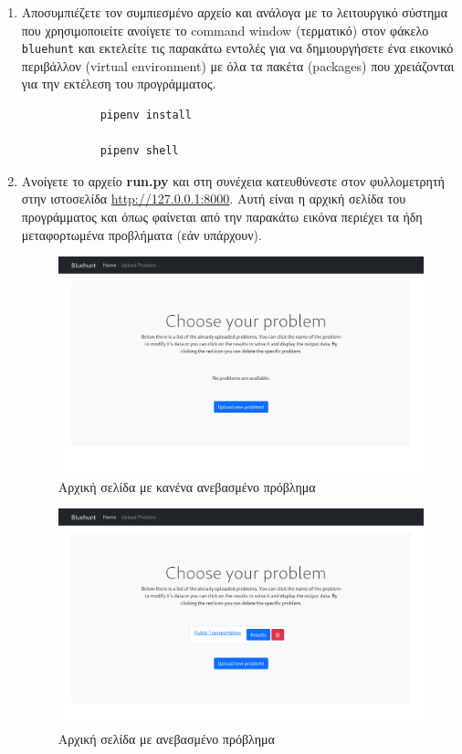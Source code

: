 \documentclass[11pt,a4paper,titlepage]{article}
\numberwithin{equation}{section}
\begin{document}
\begin{enumerate}
	\item Αποσυμπιέζετε τον συμπιεσμένο αρχείο και ανάλογα με το λειτουργικό σύστημα που χρησιμοποιείτε ανοίγετε το command window (τερματικό) στον φάκελο \texttt{bluehunt} και εκτελείτε τις παρακάτω εντολές για να δημιουργήσετε ένα εικονικό περιβάλλον (virtual environment) με όλα τα πακέτα (packages) που χρειάζονται για την εκτέλεση του προγράμματος.
	
	\begin{verbatim}
			pipenv install
			
			pipenv shell
	\end{verbatim}
	
	\item Ανοίγετε το αρχείο \textbf{run.py} και στη συνέχεια κατευθύνεστε στον φυλλομετρητή στην ιστοσελίδα \url{http://127.0.0.1:8000}. Αυτή είναι η αρχική σελίδα του προγράμματος και όπως φαίνεται από την παρακάτω εικόνα περιέχει τα ήδη μεταφορτωμένα προβλήματα (εάν υπάρχουν).
	
	\begin{figure}[H]
		\centering
		\includegraphics[width=0.8\linewidth]{media/index_no_prob.png}
		\caption{Αρχική σελίδα με κανένα ανεβασμένο πρόβλημα}
		\label{fig:index_no_prob}
	\end{figure}
	
	\begin{figure}[H]
		\centering
		\includegraphics[width=0.8\linewidth]{media/index_with_prob.png}
		\caption{Αρχική σελίδα με ανεβασμένο πρόβλημα}
		\label{fig:index_with_prob}
	\end{figure}
	

\end{enumerate}
\end{document}
